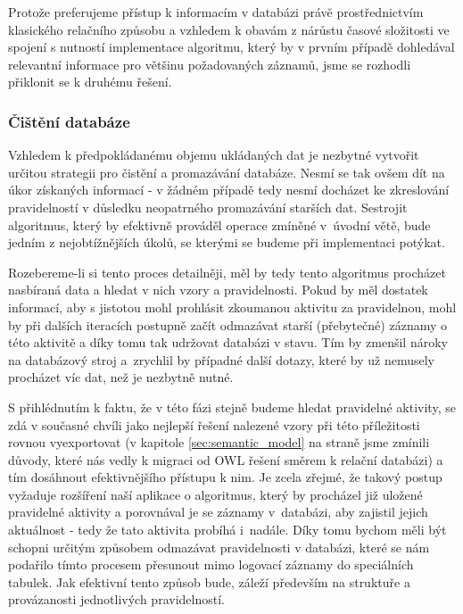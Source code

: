 \documentclass[thesis=M,czech]{FITthesis}[2012/06/26]
\begin{document}
Protože preferujeme přístup k informacím v databázi právě prostřednictvím klasického relačního způsobu a vzhledem k obavám z nárůstu časové složitosti ve spojení s nutností implementace algoritmu, který by v prvním případě dohledával relevantní informace pro většinu požadovaných záznamů, jsme se rozhodli přiklonit se k druhému řešení.

\subsubsection*{Čištění databáze}
Vzhledem k předpokládanému objemu ukládaných dat je nezbytné vytvořit určitou strategii pro čistění a promazávání databáze. Nesmí se tak ovšem dít na úkor získaných informací - v žádném případě tedy nesmí docházet ke zkreslování pravidelností v důsledku neopatrného promazávání starších dat. Sestrojit algoritmus, který by efektivně prováděl operace zmíněné v~úvodní větě, bude jedním z nejobtížnějších úkolů, se kterými se budeme při implementaci potýkat.

Rozebereme-li si tento proces detailněji, měl by tedy tento algoritmus procházet nasbíraná data a hledat v nich vzory a pravidelnosti. Pokud by měl dostatek informací, aby s jistotou mohl prohlásit zkoumanou aktivitu za pravidelnou, mohl by při dalších iteracích postupně začít odmazávat starší (přebytečné) záznamy o této aktivitě a díky tomu tak udržovat databázi v  stavu. Tím by zmenšil nároky na databázový stroj a~zrychlil by případné další dotazy, které by už nemusely procházet víc dat, než je nezbytně nutné.

S přihlédnutím k faktu, že v této fázi stejně budeme hledat pravidelné aktivity, se zdá v současné chvíli jako nejlepší řešení nalezené vzory při této příležitosti rovnou vyexportovat (v kapitole \ref{sec:semantic_model} na straně \pageref{sec:semantic_model} jsme zmínili důvody, které nás vedly k migraci od OWL řešení směrem k relační databázi) a tím dosáhnout efektivnějšího přístupu k nim. Je zcela zřejmé, že takový postup vyžaduje rozšíření naší aplikace o algoritmus, který by procházel již uložené pravidelné aktivity a porovnával je se záznamy v~databázi, aby zajistil jejich aktuálnost - tedy že tato aktivita probíhá i~nadále. Díky tomu bychom měli být schopni určitým způsobem odmazávat pravidelnosti v databázi, které se nám podařilo tímto procesem přesunout mimo logovací záznamy do speciálních tabulek. Jak efektivní tento způsob bude, záleží především na struktuře a provázanosti jednotlivých pravidelností.
\end{document}
